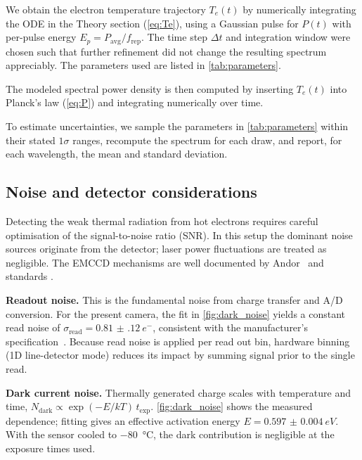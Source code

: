 \documentclass[
	parskip=half,
	a4paper,
]{scrarticle}
\begin{document}
We obtain the electron temperature trajectory $T_e(t)$ by numerically integrating the ODE in the Theory section (\autoref{eq:Te}), using a Gaussian pulse for $P(t)$ with per-pulse energy $E_p = P_{\text{avg}}/f_{\text{rep}}$. The time step $\Delta t$ and integration window were chosen such that further refinement did not change the resulting spectrum appreciably. The parameters used are listed in \autoref{tab:parameters}.

The modeled spectral power density is then computed by inserting $T_e(t)$ into Planck’s law (\autoref{eq:P}) and integrating numerically over time.

To estimate uncertainties, we sample the parameters in \autoref{tab:parameters} within their stated $1\sigma$ ranges, recompute the spectrum for each draw, and report, for each wavelength, the mean and standard deviation.

\subsection{Noise and detector considerations}
Detecting the weak thermal radiation from hot electrons requires careful optimisation of the signal-to-noise ratio (SNR). In this setup the dominant noise sources originate from the detector; laser power fluctuations are treated as negligible. The EMCCD mechanisms are well documented by Andor~\cite{andor_establishing_nodate,dr_jo_walters_sensitivity_2023} and standards \cite{european_machine_vision_association_standard_2010}.

\textbf{Readout noise.}
This is the fundamental noise from charge transfer and A/D conversion. For the present camera, the fit in \autoref{fig:dark_noise} yields a constant read noise of
\(\sigma_{\text{read}}=\SI{0.81(12)}{e^{-}}\), consistent with the manufacturer’s specification~\cite{andor_ixonem_nodate}.
Because read noise is applied per read out bin, hardware binning (1D line-detector mode) reduces its impact by summing signal prior to the single read.

\textbf{Dark current noise.}
Thermally generated charge scales with temperature and time,
\(N_\text{dark}\propto \exp(-E/kT)\,t_\text{exp}\).
\autoref{fig:dark_noise} shows the measured dependence; fitting gives an effective activation energy \(E=\SI{0.597(4)}{eV}\).
With the sensor cooled to \SI{-80}{\degreeCelsius}, the dark contribution is negligible at the exposure times used.
\end{document}
